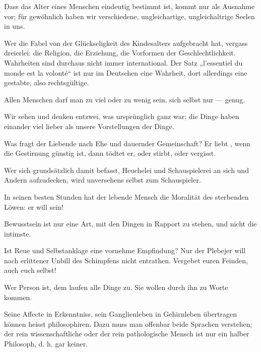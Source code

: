 Dass das Alter eines Menschen eindeutig bestimmt ist, kommt nur als Ausnahme vor; für gewöhnlich haben wir verschiedene, ungleichartige, ungleichaltrige Seelen in uns.
\par

Wer die Fabel von der Glückseligkeit des Kindesalters aufgebracht hat, vergass dreierlei: die Religion, die Erziehung, die Vorformen der Geschlechtlichkeit. Wahrheiten sind durchaus nicht immer international. Der Satz „l’essentiel du monde est la volonté“ ist nur im Deutschen eine Wahrheit, dort allerdings eine gestabte, also rechtsgültige.
\par

Allen Menschen darf man zu viel oder zu wenig sein, sich selbst nur — genug.
\par

Wir sehen und denken entzwei, was ursprünglich ganz war; die Dinge haben einander viel lieber als unsere Vorstellungen der Dinge.
\par

Was fragt der Liebende nach Ehe und dauernder Gemeinschaft? Er liebt , wenn die Gestirnung günstig ist, dann tödtet er, oder stirbt, oder vergisst.
\par

Wer sich grundsätzlich damit befasst, Heuchelei und Schauspielerei an sich und Andern aufzudecken, wird unversehens selbst zum Schauspieler.
\par

In seinen besten Stunden hat der lebende Mensch die Moralität des sterbenden Löwen: er will  sein!
\par

Bewusstsein ist nur eine Art, mit den Dingen in Rapport zu stehen, und nicht die intimste.
\par

Ist Reue und Selbstanklage eine vornehme Empfindung? Nur der Plebejer will nach erlittener Unbill des Schimpfens nicht entrathen. Vergebet euren Feinden, auch euch selbst!
\par

Wer Person ist, dem laufen alle Dinge zu. Sie wollen durch ihn zu Worte kommen.
\par

Seine Affecte in Erkenntniss, sein Ganglienleben in Gehirnleben übertragen können heisst philosophiren. Dazu muss man offenbar beide Sprachen verstehen; der rein wissenschaftliche oder der rein pathologische Mensch ist nur ein halber Philosoph, d. h. gar keiner.
\par

